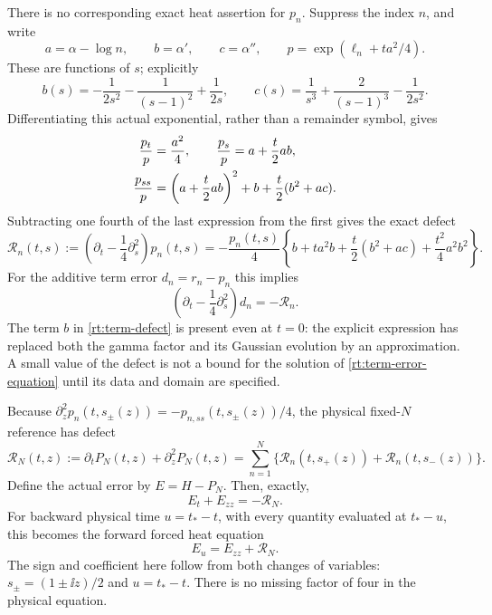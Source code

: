 There is no corresponding exact heat assertion for $p_n$.  Suppress
the index $n$, and write
\begin{equation}
 a=\alpha-\log n,\qquad b=\alpha',\qquad c=\alpha'',\qquad
 p=\exp(\ell_n+ta^2/4).
 \label{rt:abc}
\end{equation}
These are functions of $s$; explicitly
\[
 b(s)=-\frac1{2s^2}-\frac1{(s-1)^2}+\frac1{2s},\qquad
 c(s)=\frac1{s^3}+\frac2{(s-1)^3}-\frac1{2s^2}.
\]
Differentiating this actual exponential, rather than a remainder
symbol, gives
\begin{align}
 \frac{p_t}{p}&=\frac{a^2}{4},\qquad
 \frac{p_s}{p}=a+\frac t2ab,\notag\\
 \frac{p_{ss}}p&=\left(a+\frac t2ab\right)^2
                   +b+\frac t2(b^2+ac).
 \label{rt:pn-jets}
\end{align}
Subtracting one fourth of the last expression from the first gives
the exact defect
\begin{equation}
 \mathcal R_n(t,s):=\left(\partial_t-\frac14\partial_s^2\right)p_n(t,s)
 =-\frac{p_n(t,s)}4
   \left\{b+ta^2b+\frac t2(b^2+ac)
                       +\frac{t^2}{4}a^2b^2\right\}.
 \label{rt:term-defect}
\end{equation}
For the additive term error $d_n=r_n-p_n$ this implies
\begin{equation}
 \left(\partial_t-\frac14\partial_s^2\right)d_n=-\mathcal R_n.
 \label{rt:term-error-equation}
\end{equation}
The term $b$ in \eqref{rt:term-defect} is present even at $t=0$:
the explicit expression has replaced both the gamma factor and its
Gaussian evolution by an approximation.  A small value of the defect
is not a bound for the solution of \eqref{rt:term-error-equation}
until its data and domain are specified.

Because $\partial_z^2p_n(t,s_\pm(z))=-p_{n,ss}(t,s_\pm(z))/4$,
the physical fixed-$N$ reference has defect
\begin{equation}
 \mathcal R_N(t,z):=\partial_tP_N(t,z)+\partial_z^2P_N(t,z)
   =\sum_{n=1}^N\{\mathcal R_n(t,s_+(z))
                      +\mathcal R_n(t,s_-(z))\}.
 \label{rt:physical-defect}
\end{equation}
Define the actual error by $E=H-P_N$.  Then, exactly,
\begin{equation}
 E_t+E_{zz}=-\mathcal R_N.
 \label{rt:physical-error}
\end{equation}
For backward physical time $u=t_*-t$, with every quantity evaluated
at $t_*-u$, this becomes the forward forced heat equation
\begin{equation}
 E_u=E_{zz}+\mathcal R_N.
 \label{rt:backward-error}
\end{equation}
The sign and coefficient here follow from both changes of variables:
$s_\pm=(1\pm\ii z)/2$ and $u=t_*-t$.  There is no missing factor of
four in the physical equation.

